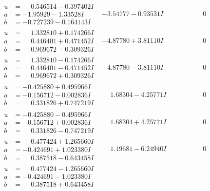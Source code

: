 \documentclass[1p]{elsarticle_modified}
\theoremstyle{definition}
\begin{document}
$$\begin{array}{c|c|c}
\begin{aligned}
u &= \phantom{-}0.546514 - 0.397402 I \\
a &= -1.95929 - 1.33528 I \\
b &= -0.727239 - 0.164143 I\end{aligned}
 & -3.54777 - 0.93531 I & \phantom{-0.000000 } 0 \\ \hline\begin{aligned}
u &= \phantom{-}1.332810 + 0.174266 I \\
a &= \phantom{-}0.446401 + 0.471452 I \\
b &= \phantom{-}0.969672 - 0.309326 I\end{aligned}
 & -4.87780 + 3.81110 I & \phantom{-0.000000 } 0 \\ \hline\begin{aligned}
u &= \phantom{-}1.332810 - 0.174266 I \\
a &= \phantom{-}0.446401 - 0.471452 I \\
b &= \phantom{-}0.969672 + 0.309326 I\end{aligned}
 & -4.87780 - 3.81110 I & \phantom{-0.000000 } 0 \\ \hline\begin{aligned}
u &= -0.425880 + 0.495966 I \\
a &= -0.156712 - 0.002836 I \\
b &= \phantom{-}0.331826 + 0.747219 I\end{aligned}
 & \phantom{-}1.68304 - 4.25771 I & \phantom{-0.000000 } 0 \\ \hline\begin{aligned}
u &= -0.425880 - 0.495966 I \\
a &= -0.156712 + 0.002836 I \\
b &= \phantom{-}0.331826 - 0.747219 I\end{aligned}
 & \phantom{-}1.68304 + 4.25771 I & \phantom{-0.000000 } 0 \\ \hline\begin{aligned}
u &= \phantom{-}0.477424 + 1.265660 I \\
a &= -0.424691 + 1.023380 I \\
b &= \phantom{-}0.387518 - 0.643458 I\end{aligned}
 & \phantom{-}1.19681 - 6.24940 I & \phantom{-0.000000 } 0 \\ \hline\begin{aligned}
u &= \phantom{-}0.477424 - 1.265660 I \\
a &= -0.424691 - 1.023380 I \\
b &= \phantom{-}0.387518 + 0.643458 I\end{aligned}

\end{array}$$
\end{document}
